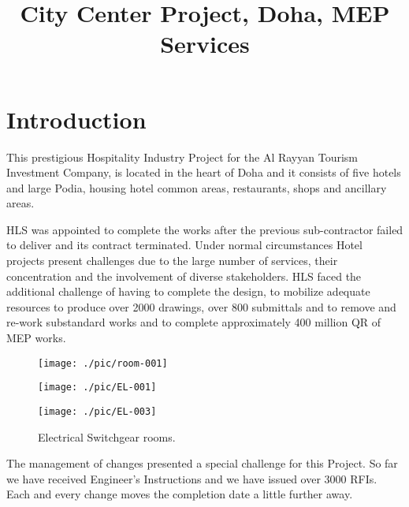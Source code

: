 \documentclass[justified, 11pt, a4paper]{tufte-book}
\title{City Center Project, Doha, MEP Services}
\begin{document}
\maketitle

\mainmatter

\chapter{Introduction}


This prestigious Hospitality Industry Project for the Al Rayyan Tourism Investment Company, is located in the heart of Doha and it consists of five hotels and large Podia, housing hotel common areas, restaurants, shops and ancillary areas. 

HLS was appointed to complete the works after the previous sub-contractor failed to deliver and its contract terminated. Under normal circumstances Hotel projects present challenges due to the large number of services, their concentration and the involvement of diverse stakeholders. HLS faced the additional challenge of having to complete the design, to mobilize adequate resources to produce over 2000 drawings, over 800 submittals and to remove and re-work substandard works and to complete approximately 400 million QR of MEP works.

\begin{fullwidth}
\begin{figure}[bt]
\texttt{[image: ./pic/room-001]}
\end{figure}
\end{fullwidth}


 
\begin{fullwidth}
\begin{figure*}[btp]
\texttt{[image: ./pic/EL-001]}
\vspace*{1pt}

\texttt{[image: ./pic/EL-003]}
\vspace*{1pt}

\caption{Electrical Switchgear rooms.}
\end{figure*}
\end{fullwidth}



The management of changes presented a special challenge for this Project. So far we have received Engineer's Instructions and we have issued over 3000 RFIs. Each and every change moves the completion date a little further away. 
\end{document}

